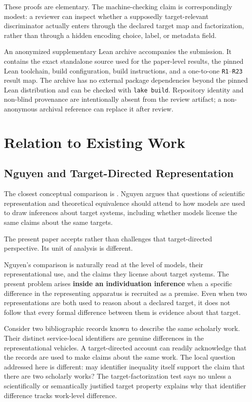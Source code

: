 \documentclass[12pt]{article}
\begin{document}
These proofs are elementary. The machine-checking claim is correspondingly modest: a reviewer can inspect whether a supposedly target-relevant discriminator actually enters through the declared target map and factorization, rather than through a hidden encoding choice, label, or metadata field.

An anonymized supplementary Lean archive accompanies the submission. It contains the exact standalone source used for the paper-level results, the pinned Lean toolchain, build configuration, build instructions, and a one-to-one \texttt{R1}--\texttt{R23} result map. The archive has no external package dependencies beyond the pinned Lean distribution and can be checked with \texttt{lake build}. Repository identity and non-blind provenance are intentionally absent from the review artifact; a non-anonymous archival reference can replace it after review.

\section{Relation to Existing Work}

\subsection{Nguyen and Target-Directed Representation}

The closest conceptual comparison is \citet{Nguyen2017RepresentationEquivalence}. Nguyen argues that questions of scientific representation and theoretical equivalence should attend to how models are used to draw inferences about target systems, including whether models license the same claims about the same targets.

The present paper accepts rather than challenges that target-directed perspective. Its unit of analysis is different.

Nguyen's comparison is naturally read at the level of models, their representational use, and the claims they license about target systems. The present problem arises \textbf{inside an individuation inference} when a specific difference in the representing apparatus is recruited as a premise. Even when two representations are both used to reason about a declared target, it does not follow that every formal difference between them is evidence about that target.

Consider two bibliographic records known to describe the same scholarly work. Their distinct service-local identifiers are genuine differences in the representational vehicles. A target-directed account can readily acknowledge that the records are used to make claims about the same work. The local question addressed here is different: may identifier inequality itself support the claim that there are two scholarly works? The target-factorization test says no unless a scientifically or semantically justified target property explains why that identifier difference tracks work-level difference.
\end{document}
